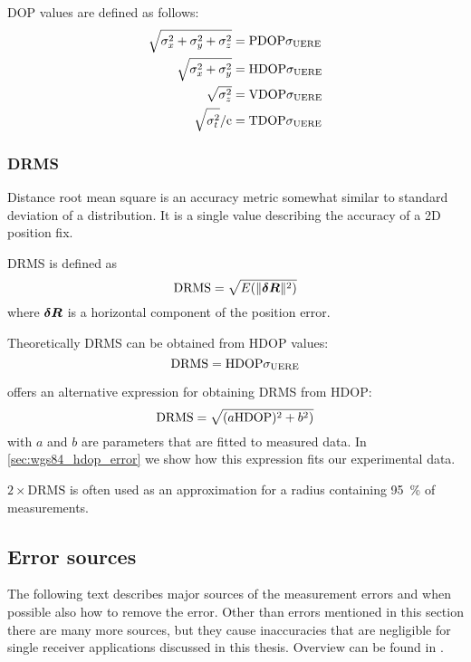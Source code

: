 DOP values are defined as follows:
\begin{subequations}
	\label{eq:dop-def}
\begin{align}
	\sqrt{\sigma^2_x + \sigma^2_y + \sigma^2_z} &= \mathrm{PDOP} \sigma_{\mathrm{UERE}} \\
	\sqrt{\sigma^2_x + \sigma^2_y} &= \mathrm{HDOP} \sigma_{\mathrm{UERE}} \\
	\sqrt{\sigma^2_z} &= \mathrm{VDOP} \sigma_{\mathrm{UERE}} \\
	\sqrt{\sigma^2_t} / \mathrm{c} &= \mathrm{TDOP} \sigma_{\mathrm{UERE}}
\end{align}
\end{subequations}

\subsubsection{DRMS}
Distance root mean square is an accuracy metric somewhat similar to
standard deviation of a distribution.
It is a single value describing the accuracy of a 2D position fix.

DRMS is defined as
\begin{equation}
	\mathrm{DRMS} = \sqrt{E(\lVert\bm{\delta R}\rVert^2)}
\end{equation}
where \(\bm{\delta R}\) is a horizontal component of the position error.

Theoretically DRMS can be obtained from HDOP values:
\begin{equation}
	\mathrm{DRMS} = \mathrm{HDOP} \sigma_{\mathrm{UERE}}
\end{equation}

\cite{www-wilson} offers an alternative expression for obtaining
DRMS from HDOP:
\begin{equation}
	\mathrm{DRMS} = \sqrt{(a \mathrm{HDOP})^2 + b^2)}
\end{equation}
with \(a\) and \(b\) are parameters that are fitted to measured data.
In \cref{sec:wgs84_hdop_error} we show how this expression fits our experimental data.

\(2 \times \mathrm{DRMS}\) is often used as an approximation for a radius containing
\SI{95}{\percent} of measurements.

\subsection{Error sources}

The following text describes major sources of the measurement errors and when possible
also how to remove the error.
Other than errors mentioned in this section there are many more sources, but they cause inaccuracies
that are negligible for single receiver applications discussed in this thesis.
Overview can be found in \cite{kouba09}.

